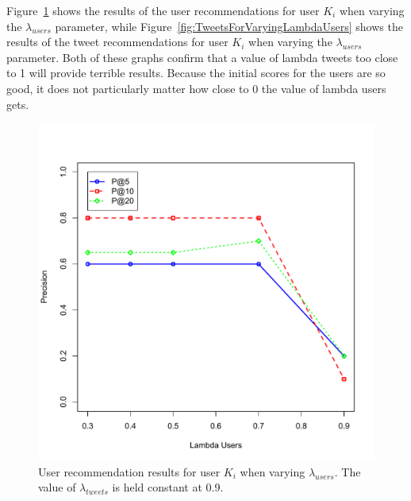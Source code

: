 Figure~\ref{fig:UsersForVaryingLambdaUsers} shows the results of the user recommendations for user $K_{i}$ when varying the $\lambda_{users}$ parameter, while Figure~\ref{fig:TweetsForVaryingLambdaUsers} shows the results of the tweet recommendations for user $K_{i}$ when varying the $\lambda_{users}$ parameter. Both of these graphs confirm that a value of lambda tweets too close to 1 will provide terrible results. Because the initial scores for the users are so good, it does not particularly matter how close to 0 the value of lambda users gets.

\begin{figure}
  \centering
  \includegraphics[scale=0.75]{Ki_Varying_LambdaUsers_UserResults}
  \caption[User recommendation results for user $K_{i}$ when varying $\lambda_{users}$]{User recommendation results for user $K_{i}$ when varying $\lambda_{users}$. The value of $\lambda_{tweets}$ is held constant at 0.9.}
  \label{fig:UsersForVaryingLambdaUsers}
\end{figure}
